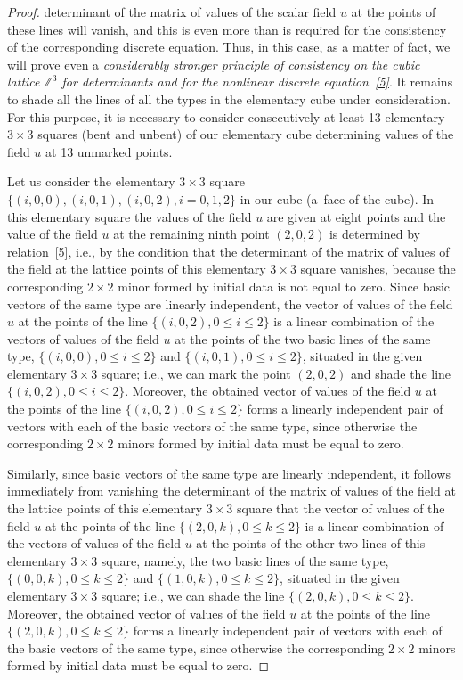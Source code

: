 \documentclass[11pt]{article}
\begin{document}
\begin{proof}
determinant of the matrix of values of the scalar f\/ield $u$ at the
points of these lines will vanish, and this is even more than is
required for the consistency of the corresponding discrete equation.
Thus, in this case, as a matter of fact, we will prove even a {\it
considerably stronger principle of consistency on the cubic lattice
$\mathbb{Z}^3$ for determinants and for the nonlinear discrete
equation~\eqref{5}}. It remains to shade all the lines of all
the types in the elementary cube under consideration. For this
purpose, it is necessary to consider consecutively at least 13
elementary $3 \times 3$ squares (bent and unbent) of our elementary
cube determining values of the f\/ield $u$ at 13 unmarked points.


Let us consider the elementary $3 \times 3$ square $\{(i, 0, 0), (i,
0, 1), (i, 0, 2), i = 0, 1, 2\}$ in our cube (a~face of the cube).
In this elementary square the values of the f\/ield $u$ are given at
eight points and the value of the f\/ield $u$ at the remaining ninth
point $(2, 0, 2)$ is determined by relation~\eqref{5}, i.e.,
by the condition that the determinant of the matrix of values of the
f\/ield at the lattice points of this elementary $3 \times 3$ square
vanishes, because the corresponding $2 \times 2$ minor formed by
initial data is not equal to zero. Since basic vectors of the same
type are linearly independent, the vector of values of the f\/ield $u$
at the points of the line $\{(i, 0, 2), 0 \leq i \leq 2\}$ is a
linear combination of the vectors of values of the f\/ield $u$ at the
points of the two basic lines of the same type, $\{(i, 0, 0), 0 \leq
i \leq 2\}$ and $\{(i, 0, 1), 0 \leq i \leq 2\}$, situated in the
given elementary $3 \times 3$ square; i.e., we can mark the point
$(2, 0, 2)$ and shade the line $\{(i, 0, 2), 0 \leq i \leq 2\}$.
Moreover, the obtained vector of values of the f\/ield $u$ at the
points of the line $\{(i, 0, 2), 0 \leq i \leq 2\}$ forms a linearly
independent pair of vectors with each of the basic vectors of the
same type, since otherwise the corresponding $2 \times 2$ minors
formed by initial data must be equal to zero.



Similarly, since basic vectors of the same type are linearly
independent, it follows imme\-diately from vanishing the determinant
of the matrix of values of the f\/ield at the lattice points of this
elementary $3 \times 3$ square that the vector of values of the
f\/ield $u$ at the points of the line $\{(2, 0, k), 0 \leq k \leq 2\}$
is a linear combination of the vectors of values of the f\/ield $u$ at
the points of the other two lines of this elementary $3 \times 3$
square, namely, the two basic lines of the same type, $\{(0, 0, k),
0 \leq k \leq 2\}$ and $\{(1, 0, k), 0 \leq k \leq 2\}$, situated in
the given elementary $3 \times 3$ square; i.e., we can shade the
line $\{(2, 0, k), 0 \leq k \leq 2\}$. Moreover, the obtained vector
of values of the f\/ield $u$ at the points of the line $\{(2, 0, k), 0
\leq k \leq 2\}$ forms a linearly independent pair of vectors with
each of the basic vectors of the same type, since otherwise the
corresponding $2 \times 2$ minors formed by initial data must be
equal to zero.



\end{proof}
\end{document}

